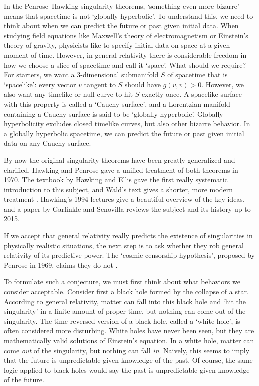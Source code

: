 \documentclass[12pt]{article}
\begin{document}
In the Penrose--Hawking singularity theorems, `something even more bizarre' means that spacetime is not `globally hyperbolic'.  To understand this, we need to think about when we can predict the future or past given initial data.  When studying field equations like Maxwell's theory of electromagnetism or Einstein's theory of gravity, physicists like to specify initial data on space at a given moment of time.  However, in general relativity there is considerable freedom in how we choose a slice of spacetime and call it `space'.   What should we require?   For starters, we want a 3-dimensional submanifold $S$ of spacetime that is `spacelike': every vector $v$ tangent to $S$ should have $g(v,v) > 0$.   However, we also want any timelike or null curve to hit $S$ exactly once.  A spacelike surface with this property is called a `Cauchy surface', and a Lorentzian manifold containing a Cauchy surface is said to be `globally hyperbolic'.   Globally hyperbolicity excludes closed timelike curves, but also other bizarre behavior.  In a globally hyperbolic spacetime, we can predict the future or past given initial data on any Cauchy surface.  

By now the original singularity theorems have been greatly generalized and clarified.  Hawking and Penrose \cite{HawkingPenrose1970} gave a unified treatment of both theorems in 1970.  The textbook by Hawking and Ellis \cite{HawkingEllis} gave the first
really systematic introduction to this subject, and Wald's text gives a shorter, 
more modern treatment \cite{Wald1984}.  Hawking's 1994 lectures \cite{Hawking1994} give a beautiful overview of the key ideas, and a paper by Garfinkle and Senovilla \cite{Hawking1994} reviews the subject and its history up to 2015.   

If we accept that general relativity really predicts the existence of singularities in physically realistic situations, the next step is to ask whether they rob general relativity of its predictive power.  The `cosmic censorship hypothesis', proposed by Penrose in 1969, claims they do not \cite{Penrose1969}.   

To formulate such a conjecture, we must first think about what behaviors we consider acceptable.  Consider first a black hole formed by the collapse of a star.  According to general relativity, matter can fall into this black hole and `hit the singularity' in a finite amount of proper time, but nothing can come out of the singularity.  The time-reversed version of a black hole, called a `white hole', is often considered more disturbing.  White holes have never been seen, but they are mathematically valid solutions of Einstein's equation.  In a white hole, matter can come \emph{out} of the singularity, but nothing can fall \emph{in}.    Naively, this seems to imply that the future is unpredictable given knowledge of the past.   Of course, the same logic applied to black holes would say the past is unpredictable given knowledge of the future.
\end{document}
